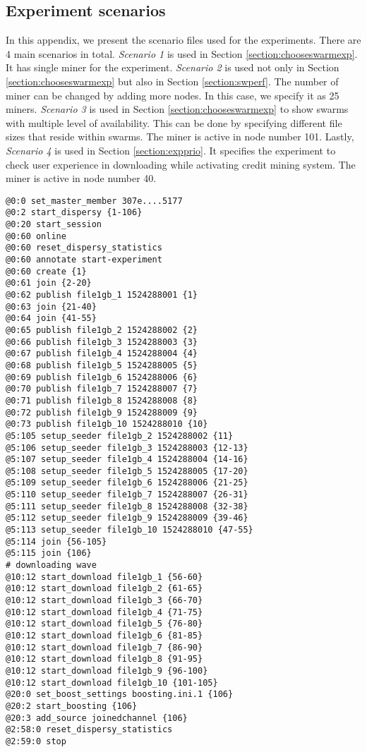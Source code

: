 \begin{appendices}
\chapter{Experiment scenarios}
\label{app:expscenario}

In this appendix, we present the scenario files used for the experiments. There are 4 main scenarios in total. \textit{Scenario 1} is used in Section \ref{section:chooseswarmexp}. It has single miner for the experiment. \textit{Scenario 2} is used not only in Section \ref{section:chooseswarmexp} but also in Section \ref{section:swperf}. The number of miner can be changed by adding more nodes. In this case, we specify it as 25 miners. \textit{Scenario 3} is used in Section \ref{section:chooseswarmexp} to show swarms with multiple level of availability. This can be done by specifying different file sizes that reside within swarms. The miner is active in node number 101.  Lastly, \textit{Scenario 4} is used in Section \ref{section:expprio}. It specifies the experiment to check user experience in downloading while activating credit mining system. The miner is active in node number 40. 

\begin{lstlisting}[caption={Scenario 1.}]
@0:0 set_master_member 307e....5177
@0:2 start_dispersy {1-106}
@0:20 start_session
@0:60 online
@0:60 reset_dispersy_statistics
@0:60 annotate start-experiment
@0:60 create {1}
@0:61 join {2-20}
@0:62 publish file1gb_1 1524288001 {1}
@0:63 join {21-40}
@0:64 join {41-55}
@0:65 publish file1gb_2 1524288002 {2}
@0:66 publish file1gb_3 1524288003 {3}
@0:67 publish file1gb_4 1524288004 {4}
@0:68 publish file1gb_5 1524288005 {5}
@0:69 publish file1gb_6 1524288006 {6}
@0:70 publish file1gb_7 1524288007 {7}
@0:71 publish file1gb_8 1524288008 {8}
@0:72 publish file1gb_9 1524288009 {9}
@0:73 publish file1gb_10 1524288010 {10}
@5:105 setup_seeder file1gb_2 1524288002 {11}
@5:106 setup_seeder file1gb_3 1524288003 {12-13}
@5:107 setup_seeder file1gb_4 1524288004 {14-16}
@5:108 setup_seeder file1gb_5 1524288005 {17-20}
@5:109 setup_seeder file1gb_6 1524288006 {21-25}
@5:110 setup_seeder file1gb_7 1524288007 {26-31}
@5:111 setup_seeder file1gb_8 1524288008 {32-38}
@5:112 setup_seeder file1gb_9 1524288009 {39-46}
@5:113 setup_seeder file1gb_10 1524288010 {47-55}
@5:114 join {56-105}
@5:115 join {106}
# downloading wave
@10:12 start_download file1gb_1 {56-60}
@10:12 start_download file1gb_2 {61-65}
@10:12 start_download file1gb_3 {66-70}
@10:12 start_download file1gb_4 {71-75}
@10:12 start_download file1gb_5 {76-80}
@10:12 start_download file1gb_6 {81-85}
@10:12 start_download file1gb_7 {86-90}
@10:12 start_download file1gb_8 {91-95}
@10:12 start_download file1gb_9 {96-100}
@10:12 start_download file1gb_10 {101-105}
@20:0 set_boost_settings boosting.ini.1 {106}
@20:2 start_boosting {106}
@20:3 add_source joinedchannel {106}
@2:58:0 reset_dispersy_statistics
@2:59:0 stop
\end{lstlisting}


\end{appendices}
